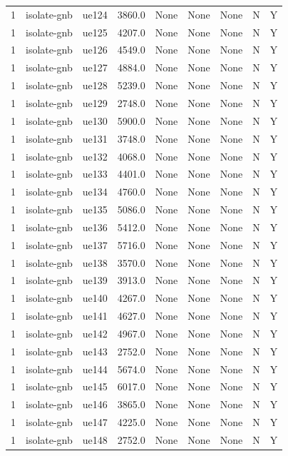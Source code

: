 \begin{table}[ht]
\begin{tabular}{|c|c|c|c|c|c|c|c|c|}
1 & isolate-gnb & ue124 & 3860.0 & None & None & None & N & Y \\
1 & isolate-gnb & ue125 & 4207.0 & None & None & None & N & Y \\
1 & isolate-gnb & ue126 & 4549.0 & None & None & None & N & Y \\
1 & isolate-gnb & ue127 & 4884.0 & None & None & None & N & Y \\
1 & isolate-gnb & ue128 & 5239.0 & None & None & None & N & Y \\
1 & isolate-gnb & ue129 & 2748.0 & None & None & None & N & Y \\
1 & isolate-gnb & ue130 & 5900.0 & None & None & None & N & Y \\
1 & isolate-gnb & ue131 & 3748.0 & None & None & None & N & Y \\
1 & isolate-gnb & ue132 & 4068.0 & None & None & None & N & Y \\
1 & isolate-gnb & ue133 & 4401.0 & None & None & None & N & Y \\
1 & isolate-gnb & ue134 & 4760.0 & None & None & None & N & Y \\
1 & isolate-gnb & ue135 & 5086.0 & None & None & None & N & Y \\
1 & isolate-gnb & ue136 & 5412.0 & None & None & None & N & Y \\
1 & isolate-gnb & ue137 & 5716.0 & None & None & None & N & Y \\
1 & isolate-gnb & ue138 & 3570.0 & None & None & None & N & Y \\
1 & isolate-gnb & ue139 & 3913.0 & None & None & None & N & Y \\
1 & isolate-gnb & ue140 & 4267.0 & None & None & None & N & Y \\
1 & isolate-gnb & ue141 & 4627.0 & None & None & None & N & Y \\
1 & isolate-gnb & ue142 & 4967.0 & None & None & None & N & Y \\
1 & isolate-gnb & ue143 & 2752.0 & None & None & None & N & Y \\
1 & isolate-gnb & ue144 & 5674.0 & None & None & None & N & Y \\
1 & isolate-gnb & ue145 & 6017.0 & None & None & None & N & Y \\
1 & isolate-gnb & ue146 & 3865.0 & None & None & None & N & Y \\
1 & isolate-gnb & ue147 & 4225.0 & None & None & None & N & Y \\
1 & isolate-gnb & ue148 & 2752.0 & None & None & None & N & Y \\

\end{tabular}
\end{table}
